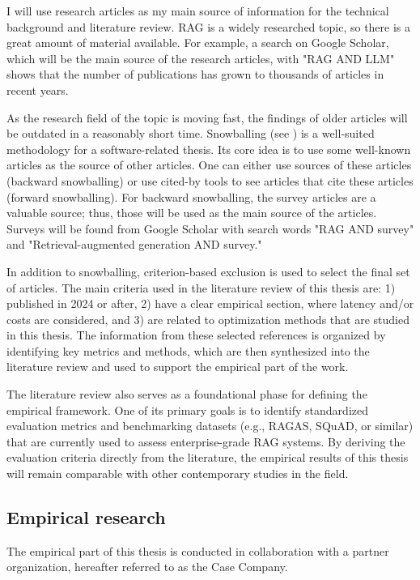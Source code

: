 \documentclass[12pt,a4paper,english,oneside]{article}
\begin{document}
I will use research articles as my main source of information for the technical background and literature review. RAG is a widely researched topic, so there is a great amount of material available. For example, a search on Google Scholar, which will be the main source of the research articles, with "RAG AND LLM" shows that the number of publications has grown to thousands of articles in recent years.

As the research field of the topic is moving fast, the findings of older articles will be outdated in a reasonably short time. Snowballing (see \cite{guidelines}) is a well-suited methodology for a software-related thesis. Its core idea is to use some well-known articles as the source of other articles. One can either use sources of these articles (backward snowballing) or use cited-by tools to see articles that cite these articles (forward snowballing). For backward snowballing, the survey articles are a valuable source; thus, those will be used as the main source of the articles. Surveys will be found from Google Scholar with search words "RAG AND survey" and "Retrieval-augmented generation AND survey."

In addition to snowballing, criterion-based exclusion is used to select the final set of articles. The main criteria used in the literature review of this thesis are: 1) published in 2024 or after, 2) have a clear empirical section, where latency and/or costs are considered, and 3) are related to optimization methods that are studied in this thesis. The information from these selected references is organized by identifying key metrics and methods, which are then synthesized into the literature review and used to support the empirical part of the work.

The literature review also serves as a foundational phase for defining the empirical framework. One of its primary goals is to identify standardized evaluation metrics and benchmarking datasets (e.g., RAGAS, SQuAD, or similar) that are currently used to assess enterprise-grade RAG systems. By deriving the evaluation criteria directly from the literature, the empirical results of this thesis will remain comparable with other contemporary studies in the field.

\subsection{Empirical research}

The empirical part of this thesis is conducted in collaboration with a partner organization, hereafter referred to as the Case Company.
\end{document}
